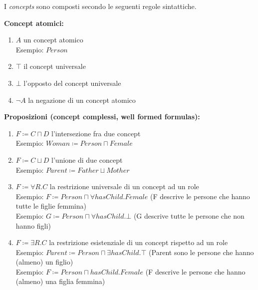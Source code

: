 \begin{fdefinition}
I \textit{concepts} sono composti secondo le seguenti regole sintattiche.

\textbf{Concept atomici:}
\begin{enumerate}
\item $A$ un concept atomico \\ Esempio: $Person$
\item $\top$ il concept universale
\item $\bot$ l'opposto del concept universale
\item $\lnot A$ la negazione di un concept atomico
\end{enumerate}
\textbf{Proposizioni (concept complessi, well formed formulas):}
\begin{enumerate}
\item $F \coloneqq C \sqcap D$ l'intersezione fra due concept \\ Esempio: $Woman \coloneqq Person \sqcap Female$
\item $F \coloneqq C \sqcup D$ l'unione di due concept \\ Esempio: $Parent \coloneqq Father \sqcup Mother$
\item $F \coloneqq \forall R. C$ la restrizione universale di un concept ad un role \\ Esempio: $F \coloneqq Person \sqcap \forall hasChild. Female$ (F descrive le persone che hanno tutte le figlie femmina)\\ Esempio: $G \coloneqq Person \sqcap \forall hasChild.\bot$ (G descrive tutte le persone che non hanno figli)
\item $F \coloneqq \exists R. C$ la restrizione esistenziale di un concept rispetto ad un role \\ Esempio: $Parent \coloneqq Person \sqcap \exists hasChild.\top$ (Parent sono le persone che hanno (almeno) un figlio) \\ Esempio: $F \coloneqq Person \sqcap hasChild. Female$ (F descrive le persone che hanno (almeno) una figlia femmina)
\end{enumerate}
\end{fdefinition}

